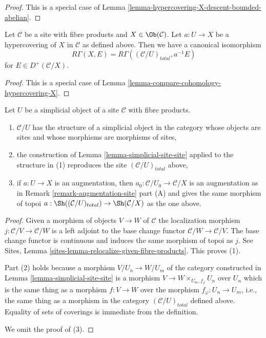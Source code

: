 \begin{proof}
This is a special case of
Lemma \ref{lemma-hypercovering-X-descent-bounded-abelian}.
\end{proof}

\begin{lemma}
\label{lemma-compare-cohomology-hypercovering-X-simple}
Let $\mathcal{C}$ be a site with fibre products and $X \in \Ob(\mathcal{C})$.
Let $a : U \to X$ be a hypercovering of $X$ in $\mathcal{C}$ as defined above.
Then we have a canonical isomorphism
$$
R\Gamma(X, E) = R\Gamma((\mathcal{C}/U)_{total}, a^{-1}E)
$$
for $E \in D^+(\mathcal{C}/X)$.
\end{lemma}

\begin{proof}
This is a special case of
Lemma \ref{lemma-compare-cohomology-hypercovering-X}.
\end{proof}

\begin{lemma}
\label{lemma-sr-when-fibre-products}
Let $U$ be a simplicial object of a site $\mathcal{C}$
with fibre products.
\begin{enumerate}
\item $\mathcal{C}/U$ has the structure of a simplicial object
in the category whose objects are sites and
whose morphisms are morphisms of sites,
\item the construction of Lemma \ref{lemma-simplicial-site-site}
applied to the structure in (1)
reproduces the site $(\mathcal{C}/U)_{total}$ above,
\item if $a : U \to X$ is an augmentation, then
$a_0 : \mathcal{C}/U_0 \to \mathcal{C}/X$ is an augmentation
as in Remark \ref{remark-augmentation-site} part (A) and gives the
same morphism of topoi
$a : \Sh((\mathcal{C}/U)_{total}) \to \Sh(\mathcal{C}/X)$
as the one above.
\end{enumerate}
\end{lemma}

\begin{proof}
Given a morphism of objects $V \to W$ of $\mathcal{C}$ the localization
morphism $j : \mathcal{C}/V \to \mathcal{C}/W$ is a left adjoint to
the base change functor $\mathcal{C}/W \to \mathcal{C}/V$.
The base change functor is continuous and induces the same morphism of
topoi as $j$. See
Sites, Lemma \ref{sites-lemma-relocalize-given-fibre-products}.
This proves (1).

\medskip\noindent
Part (2) holds because a morphism $V/U_n \to W/U_m$
of the category constructed
in Lemma \ref{lemma-simplicial-site-site}
is a morphism $V \to W \times_{U_m, f_\varphi} U_n$ over $U_n$
which is the same thing as a morphism $f : V \to W$
over the morphism $f_\varphi : U_n \to U_m$, i.e.,
the same thing as a morphism in the category $(\mathcal{C}/U)_{total}$
defined above. Equality of sets of coverings is
immediate from the definition.

\medskip\noindent
We omit the proof of (3).
\end{proof}






